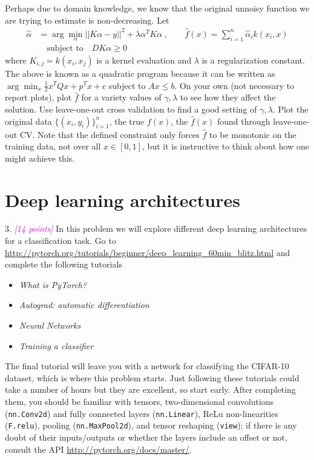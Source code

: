 \documentclass{article}
\newcommand{\1}{\mathbf{1}}
\newcommand{\grade}[1]{\small\textcolor{magenta}{\emph{[#1 points]}} \normalsize}
\begin{document}
\begin{enumerate}
Perhaps due to domain knowledge, we know that the original unnoisy function we are trying to estimate is non-decreasing. 
Let
\begin{align*}
  \widehat{\alpha} &= \arg\min_\alpha ||K\alpha - y||^2  + \lambda \alpha^T K \alpha \ , \quad \quad \widehat{f}(x)=\sum_{i=1}^n \widehat{\alpha}_i k(x_i,x) \\
  & \quad \text{subject to} \quad D K \alpha \geq 0
\end{align*}
where $K_{i,j} = k(x_i,x_j)$ is a kernel evaluation and $\lambda$ is a regularization constant.
The above is known as a quadratic program because it can be written as $\arg\min_x \frac{1}{2} x^T Q x + p^T x +c$ subject to $Ax \leq b$.
On your own (not necessary to report plots), plot $\widehat{f}$ for a variety values of $\gamma, \lambda$ to see how they affect the solution.
Use leave-one-out cross validation to find a good setting of $\gamma, \lambda$. 
Plot the original data $\{(x_i,y_i)\}_{i=1}^n$, the true $f(x)$, the $\widehat{f}(x)$ found through leave-one-out CV.
Note that the defined constraint only forces $\widehat{f}$ to be monotonic on the training data, not over all $x \in [0,1]$, but it is instructive to think about how one might achieve this.
\end{enumerate}


\section*{Deep learning architectures}

3. \grade{14} In this problem we will explore different deep learning architectures for a classification task. 
Go to \url{http://pytorch.org/tutorials/beginner/deep_learning_60min_blitz.html} and complete the following tutorials\\[-18pt]
\begin{itemize}
  \item \emph{What is PyTorch?}\\[-18pt]
  \item \emph{Autograd: automatic differentiation}\\[-18pt]
  \item \emph{Neural Networks}\\[-18pt]
  \item \emph{Training a classifier}\\[-18pt]
\end{itemize}
The final tutorial will leave you with a network for classifying the CIFAR-10 dataset, which is where this problem starts. 
Just following these tutorials could take a number of hours but they are excellent, so start early. 
After completing them, you should be familiar with tensors, two-dimensional convolutions (\texttt{nn.Conv2d}) and fully connected layers (\texttt{nn.Linear}), ReLu non-linearities (\texttt{F.relu}), pooling (\texttt{nn.MaxPool2d}), and tensor reshaping (\texttt{view}); if there is any doubt of their inputs/outputs or whether the layers include an offset or not, consult the API \url{http://pytorch.org/docs/master/}. \\
\end{document}
